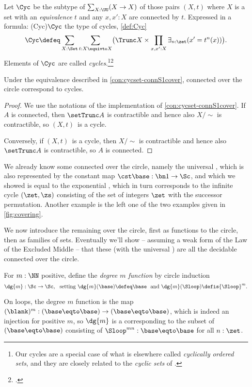 \begin{definition}\label{def:Cyc}
  Let $\Cyc$ be the subtype of $\sum_{X:\UU}(X\to X)$ of those
  pairs $(X,t)$ where $X$ is a \emph{\nonempty} set with an
  \emph{equivalence} $t$ and any $x,x':X$ are connected by $t$.
  Expressed in a formula: \glossary(Cyc){$\protect\Cyc$}%
  {the type of cycles, \cref{def:Cyc}} 
\[
\Cyc \defeq \sum_{X:\Set}\sum_{t:X\equivto X} \bigl( {\Trunc X} \times
            \prod_{x,x':X}\exists_{n:\zet}(x'=t^n(x))\bigr).
\]
  Elements of $\Cyc$ are called \emph{cycles}.\footnote{%
    Our cycles are a special case of what is elsewhere called
    \emph{cyclically ordered sets},
    and they are closely related to the \emph{cyclic sets} of
    \citeauthor{Connes1983}\footnotemark{}.}\footcitetext{Connes1983}
\end{definition}
\begin{corollary}\label{thm:cycset-connS1cover}
  Under the equivalence described in \cref{con:cycset-connS1cover},
  connected \coverings over the circle correspond to cycles.
\end{corollary}
\begin{proof}
  We use the notations of the implementation of \cref{con:cycset-connS1cover}.
  If $A$ is connected, then $\setTrunc A$ is contractible and hence also
  $X/\sim$ is contractible, so $(X,t)$ is a cycle.

  Conversely, if $(X,t)$ is a cycle, then $X/\sim$ is contractible
  and hence also $\setTrunc A$ is contractible, so $A$ is connected.
\end{proof}

We already know some connected \coverings over the circle,
namely the universal \covering, which is also represented by
the constant map $\cst\base:\bn 1\to\Sc$, and which we showed
is equal to the exponential \covering, which in turn corresponds
to the infinite cycle $(\zet,\zs)$
consisting of the set of integers $\zet$ with the successor permutation.
Another example is the left one of the two examples given in
\cref{fig:covering}.

We now introduce the remaining \coverings over the circle, first as functions to the circle, then as families of sets.
Eventually we'll show -- assuming a weak form
of the Law of the Excluded Middle -- that these (with the universal \covering)
are all the decidable connected \coverings over the circle.

\begin{definition}\label{def:mfoldS1cover}
For $m:\NN$ positive, define the \emph{degree $m$ function} by circle induction
\[
\dg{m}:\Sc\to \Sc, \text{~~setting~}
\dg{m}(\base)\defeq\base \text{~~and~}
\dg{m}(\Sloop)\defis{\Sloop}^m.\qedhere
\]
\end{definition}
On loops, the degree $m$ function is the map
$(\blank)^m : (\base\eqto \base) \to (\base\eqto \base)$,
which is indeed an injection for positive $m$,
so $\dg{m}$ is a \covering corresponding to the subset of $(\base\eqto \base)$ consisting
of ${\Sloop}^{mn} : \base\eqto \base$ for all $n:\zet$.

